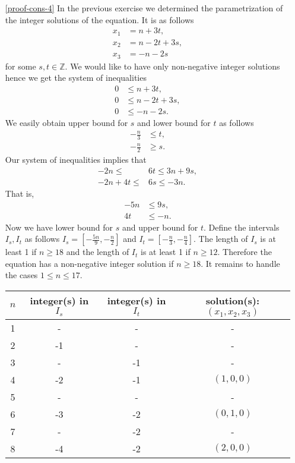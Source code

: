 \begin{enumerate}
\item[\ref{proof-cons-4}] In the previous exercise we determined the parametrization of the integer 
solutions of the equation. It is as follows
\begin{align*}
x_1&=n+3t,\\
x_2&=n-2t+3s,\\
x_3&=-n-2s
\end{align*}
for some $s,t\in\mathbb{Z}$. We would like to have only non-negative integer solutions hence we
get the system of inequalities
\begin{align*}
0&\leq n+3t,\\
0&\leq n-2t+3s,\\
0&\leq -n-2s.
\end{align*}
We easily obtain upper bound for $s$ and lower bound for $t$ as follows
\begin{align*}
-\frac{n}{3}&\leq t,\\
-\frac{n}{2}&\geq s.
\end{align*}
Our system of inequalities implies that
\begin{align*}
-2n\leq &6t\leq 3n+9s,\\
-2n+4t\leq &6s\leq -3n.
\end{align*}
That is, 
\begin{align*}
-5n &\leq 9s,\\
 4t &\leq -n.
\end{align*}
Now we have lower bound for $s$ and upper bound for $t$. Define the intervals $I_s,I_t$ as follows $I_s=[-\frac{5n}{9},-\frac{n}{2}]$
and $I_t=[-\frac{n}{3},-\frac{n}{4}]$. The length of $I_s$ is at least 1 if $n\geq 18$ and the length of $I_t$ is at least 1 if $n\geq 12$.
Therefore the equation has a non-negative integer solution if $n\geq 18$. It remains to handle the cases $1\leq n\leq 17$.
\begin{center}
\begin{tabular}{|c|c|c|c|}
\hline
$n$ & integer(s) in $I_s$ & integer(s) in $I_t$ & solution(s): $(x_1,x_2,x_3)$\\
\hline
1 & - & - & -\\
\hline
2 & -1 & - & -\\
\hline
3 & - & -1 & -\\
\hline
4 & -2 & -1 & $(1,0,0)$\\
\hline
5 & - & - & -\\
\hline
6 & -3 & -2 & $(0,1,0)$\\
\hline
7 & - & -2 & -\\
\hline
8 & -4 & -2 & $(2,0,0)$\\

\end{tabular}
\end{center}
\end{enumerate}
